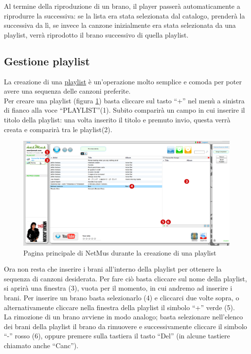 Al termine della riproduzione di un brano, il player passer\`a automaticamente a
riprodurre la successiva: se la lista era stata selezionata dal catalogo,
prender\`a la successiva da l\`i, se invece la canzone inizialmente era stata
selezionata da una playlist, verr\`a riprodotto il brano successivo di quella
playlist.

\subsection{Gestione playlist}

La creazione di una \underline{playlist} \`e un'operazione molto semplice e
comoda per poter avere una sequenza delle canzoni preferite.\\
Per creare una playlist (figura \ref{fig:playlist}) basta cliccare sul tasto
``+'' nel men\`u a sinistra di fianco alla voce ``PLAYLIST''(1). Subito comparir\`a un campo in cui
inserire il titolo della playlist: una volta inserito il titolo e premuto invio,
questa verr\`a creata e comparir\`a tra le playlist(2).\\
\begin{figure}[!htbp]
  \centering
  \includegraphics[width=14cm]{img/MU/new_playlist.png}
\caption{Pagina principale di NetMus durante la creazione di una playlist}
\label{fig:playlist}
\end{figure}
 
Ora non resta che inserire i brani all'interno della playlist
per ottenere la sequenza di canzoni desiderata. Per fare ci\`o basta cliccare sul
nome della playlist, si aprir\`a una finestra (3), vuota per il momento, in cui
andremo ad inserire i brani. Per inserire un brano basta
selezionarlo (4) e cliccarci due volte sopra, o alternativamente cliccare nella
finestra della playlist il simbolo ``+'' verde (5).\\ 
La rimozione di un brano avviene in modo analogo; basta selezionare
nell'elenco dei brani della playlist il brano da rimuovere e successivamente
cliccare il simbolo ``-'' rosso (6), oppure premere sulla tastiera il tasto
``Del'' (in alcune tastiere chiamato anche ``Canc'').\\

